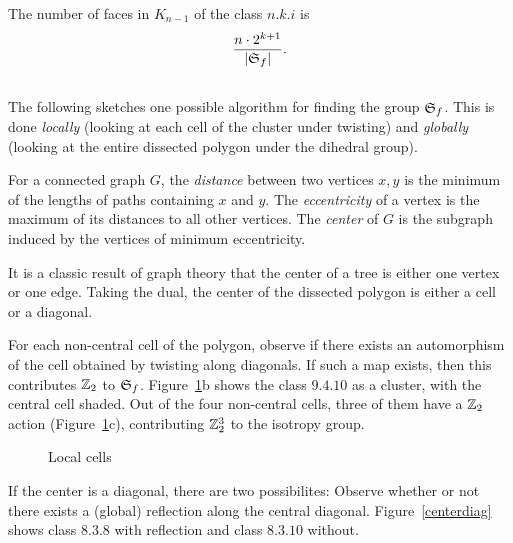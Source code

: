 \documentclass[10pt]{amsart}
\begin{document}
        \begin{prop}
        The number of faces in $K_{n-1}$ of the class $n.k.i$ is 
        $$\frac{n \cdot 2^{k+1}}{ |{\mathfrak S}_f|}.$$
        \label{p:new}
        \end{prop}
        
        
        \subsection{}
        The following sketches one possible algorithm for finding the group ${\mathfrak S}_f$.  This is done {\em locally} (looking at each cell of the cluster under twisting) and {\em globally} (looking at the entire dissected polygon under the dihedral group).
        
        \begin{defn}
        For a connected graph $G$, the {\em distance} between two vertices $x, y$ is the minimum of the lengths of paths containing $x$ and $y$. The {\em eccentricity} of a vertex is the maximum of its distances to all other vertices.  The {\em center} of $G$ is the subgraph induced by the vertices of minimum eccentricity.
        \end{defn}
        
        \noindent It is a classic result of graph theory that the center of a tree is either one vertex or one edge. Taking the dual, the center of the dissected polygon is either a cell or a diagonal.
        
         For each non-central cell of the polygon, observe if there exists an automorphism of the cell obtained by twisting along diagonals. If such a map exists, then this contributes ${\mathbb Z}_2$ to ${\mathfrak S}_f$.  Figure~\ref{localcell}b shows the class $9.4.10$ as a cluster, with the central cell shaded. Out of the four non-central cells, three of them have a ${\mathbb Z}_2$ action (Figure~\ref{localcell}c), contributing ${\mathbb Z}_2^3$ to the isotropy group.
        
        \begin{figure}[h]
        \caption{Local cells}
        \label{localcell}
        \end{figure}
        
         If the center is a diagonal, there are two possibilites: Observe whether or not there exists a (global) reflection along the central diagonal.  Figure~\ref{centerdiag} shows class $8.3.8$ with reflection and class $8.3.10$ without.
        
\end{document}
